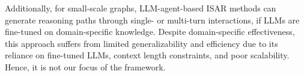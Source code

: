 {%
Additionally, for small-scale graphs, LLM-agent-based ISAR methods {\cite{DoG}} can generate reasoning paths through single- or multi-turn interactions, if LLMs are fine-tuned on domain-specific knowledge.
Despite domain-specific effectiveness, this approach suffers from limited generalizability and efficiency due to its reliance on fine-tuned LLMs, context length constraints, and poor scalability. Hence, it is not our focus of the framework.

%

}
